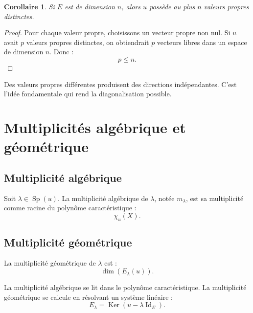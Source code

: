 \documentclass[11pt,a4paper]{article}
\newcommand{\Ker}{\operatorname{Ker}}
\newcommand{\Id}{\operatorname{Id}}
\newcommand{\Sp}{\operatorname{Sp}}
\newtheorem{corollaire}[prop]{Corollaire}
\begin{document}
\begin{corollaire}
Si \(E\) est de dimension \(n\), alors \(u\) possède au plus \(n\) valeurs propres distinctes.
\end{corollaire}

\begin{proof}
Pour chaque valeur propre, choisissons un vecteur propre non nul.  
Si \(u\) avait \(p\) valeurs propres distinctes, on obtiendrait \(p\) vecteurs libres dans un espace de dimension \(n\).  
Donc :
\[
p\leq n.
\]
\end{proof}

\begin{retenirbox}
Des valeurs propres différentes produisent des directions indépendantes.  
C'est l'idée fondamentale qui rend la diagonalisation possible.
\end{retenirbox}

\section{Multiplicités algébrique et géométrique}

\subsection{Multiplicité algébrique}

\begin{definitionbox}
Soit \(\lambda\in\Sp(u)\).  
La multiplicité algébrique de \(\lambda\), notée \(m_\lambda\), est sa multiplicité comme racine du polynôme caractéristique :
\[
\chi_u(X).
\]
\end{definitionbox}

\subsection{Multiplicité géométrique}

\begin{definitionbox}
La multiplicité géométrique de \(\lambda\) est :
\[
\dim(E_\lambda(u)).
\]
\end{definitionbox}

\begin{retenirbox}
La multiplicité algébrique se lit dans le polynôme caractéristique.  
La multiplicité géométrique se calcule en résolvant un système linéaire :
\[
E_\lambda=\Ker(u-\lambda\Id_E).
\]
\end{retenirbox}
\end{document}
